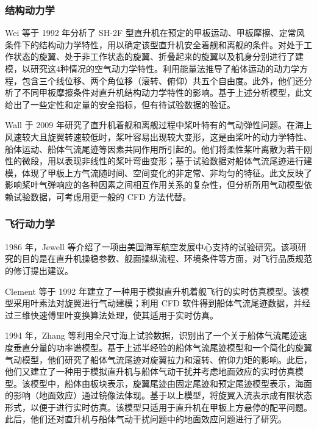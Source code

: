\subsubsection{结构动力学}

Wei 等于 1992 年分析了 SH-2F 型直升机在预定的甲板运动、甲板摩擦、定常风条件下的结构动力学特性，用以确定该型直升机安全着舰和离舰的条件。对处于工作状态的旋翼、处于非工作状态的旋翼、折叠起来的旋翼以及机身分别进行了建模，以研究这4种情况的空气动力学特性。利用能量法推导了船体运动的动力学方程，包含三个线位移、两个角位移（滚转、俯仰）共五个自由度。此外，他们还分析了不同甲板摩擦条件对直升机结构动力学特性的影响。基于上述分析模型，此文给出了一些定性和定量的安全指标，但有待试验数据的验证。

Wall 于 2009 年研究了直升机着舰和离舰过程中桨叶特有的气动弹性问题。在海上风速较大且旋翼转速较低时，桨叶容易出现较大变形，这是由桨叶的动力学特性、船体运动、船体气流尾迹等因素共同作用所引起的。他们将柔性桨叶离散为若干刚性的微段，用以表现非线性的桨叶弯曲变形；基于试验数据对船体气流尾迹进行建模，体现了甲板上方气流随时间、空间变化的非定常、非均匀的特征。此文反映了影响桨叶气弹响应的各种因素之间相互作用关系的复杂性，但分析所用气动模型依赖试验数据，可考虑用更一般的
CFD 方法代替。

\subsubsection{飞行动力学}

1986 年，Jewell 等介绍了一项由美国海军航空发展中心支持的试验研究。该项研究的目的是在直升机操稳参数、舰面操纵流程、环境条件等方面，对飞行品质规范的修订提出建议。

Clement 等于 1992 年建立了一种用于模拟直升机着舰飞行的实时仿真模型。该模型采用叶素法对旋翼进行气动建模；利用
CFD 软件得到船体气流尾迹数据，并经过三维快速傅里叶变换算法处理，使其适用于实时仿真。

1994 年，Zhang 等利用全尺寸海上试验数据，识别出了一个关于船体气流尾迹速度垂直分量的功率谱模型。基于上述半经验的船体气流尾迹模型和一个简化的旋翼气动模型，他们研究了船体气流尾迹对旋翼拉力和滚转、俯仰力矩的影响。此后，他们又建立了一种用于模拟直升机与船体气动干扰并考虑地面效应的实时仿真模型。该模型中，船体由板块表示，旋翼尾迹由固定尾迹和预定尾迹模型表示，海面的影响（地面效应）通过镜像法体现。基于以上模型，将旋翼入流表示成有限状态形式，以便于进行实时仿真。该模型只适用于直升机在甲板上方悬停的配平问题。此后，他们还对直升机与船体气动干扰问题中的地面效应问题进行了研究。

